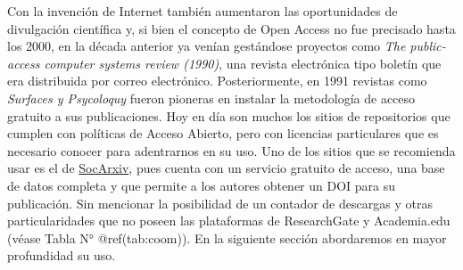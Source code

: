 \documentclass[
  spanish,
  letterpaper,
  DIV=11,
  numbers=noendperiod]{scrreprt}
\begin{document}
Con la invención de Internet también aumentaron las oportunidades de
divulgación científica y, si bien el concepto de Open Access no fue
precisado hasta los 2000, en la década anterior ya venían gestándose
proyectos como \emph{The public-access computer systems review (1990)},
una revista electrónica tipo boletín que era distribuida por correo
electrónico. Posteriormente, en 1991 revistas como \emph{Surfaces y
Psycoloquy} fueron pioneras en instalar la metodología de acceso
gratuito a sus publicaciones. Hoy en día son muchos los sitios de
repositorios que cumplen con políticas de Acceso Abierto, pero con
licencias particulares que es necesario conocer para adentrarnos en su
uso. Uno de los sitios que se recomienda usar es el de
\href{https://socopen.org/}{SocArxiv}, pues cuenta con un servicio
gratuito de acceso, una base de datos completa y que permite a los
autores obtener un DOI para su publicación. Sin mencionar la posibilidad
de un contador de descargas y otras particularidades que no poseen las
plataformas de ResearchGate y Academia.edu (véase Tabla N°
@ref(tab:coom)). En la siguiente sección abordaremos en mayor
profundidad su uso.
\end{document}

